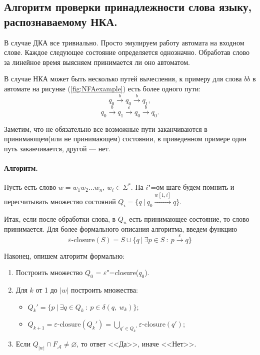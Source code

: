 \subsection{Алгоритм проверки принадлежности слова языку, распознаваемому НКА.} \label{alg:word}

В случае ДКА все тривиально. Просто эмулируем работу автомата на входном слове. Каждое следующее состояние определяется однозначно.
Обработав слово за линейное время выясняем принимается ли оно автоматом.

В случае НКА может быть несколько путей вычесления, к примеру для слова $bb$ в автомате на рисунке (\ref{fig:NFAexample})
есть более одного пути: $$q_0\xrightarrow{b} q_0\xrightarrow{b} q_1,$$
$$q_0\xrightarrow{b} q_1\xrightarrow{\varepsilon} q_0\xrightarrow{b} q_0.$$

Заметим, что не обязательно все возможные пути заканчиваются в принимающем(или не принимающем) состоянии, в приведенном примере один путь
заканчивается, другой --- нет.

\paragraph*{Алгоритм.} Пусть есть слово $w = w_1w_2\ldots w_n$, $w_i\in\Sigma^*$. На $i$"=ом шаге будем помнить и пересчитывать множество состояний
$Q_i=\{q\:|\:q_0\xrightarrow{w[1,i]}q\}$.

Итак, если после обработки слова, в $Q_n$ есть принимающее состояние, то слово принимается.
Для более формального описания алгоритма, введем функцию
$$\varepsilon\text{-closure}(S)=S\cup \{q\:|\:\exists p\in S\: :\: p\xrightarrow{\varepsilon}q\}$$

Наконец, опишем алгоритм формально:

\begin{enumerate}
  \item Построить множество $Q_0$ = $\varepsilon$"=closure($q_0$).
  \item Для $k$ от 1 до $|w|$ построить множества:
        \begin{itemize}
          \item $Q_k'=\{p\:|\:\exists q\in Q_k\: :\: p\in\delta(q,\:w_k)\}$;
          \item $Q_{k+1}=\varepsilon\text{-closure}(Q_k')=\displaystyle{\bigcup _{q'\in Q_k'}}\varepsilon\text{-closure}(q')$;
        \end{itemize}
  \item Если $Q_{|w|}\cap F_{\mathcal{A}}\neq \varnothing$, то ответ <<Да>>, иначе <<Нет>>.
\end{enumerate}


